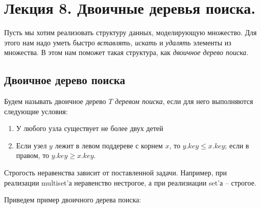 \documentclass[../main.tex]{subfiles}
\begin{document}
	\section{Лекция 8. Двоичные деревья поиска.}
	
	Пусть мы хотим реализовать структуру данных, моделирующую множество. Для этого нам надо уметь быстро \textit{вставлять, искать} и \textit{удалять} элементы из множества. В этом нам поможет такая структура, как \textit{двоичное дерево поиска}.
	
	\subsection{Двоичное дерево поиска}
	
	Будем называть двоичное дерево $T$ \textit{деревом поиска}, если для него выполняются следующие условия:
	\begin{enumerate}
		\item У любого узла существует не более двух детей
		\item Если узел $y$ лежит в левом поддереве с корнем $x$, то $y.key \leqslant x.key$; если в правом, то $y.key \geqslant x.key$.
	\end{enumerate}

	\begin{remark}
		Строгость неравенства зависит от поставленной задачи. Например, при реализации multiset'а неравенство нестрогое, а при реализиации set'а -- строгое.
	\end{remark}
	
	Приведем пример двоичного дерева поиска:
	
	\begin{center}
	\end{center}
\end{document}
